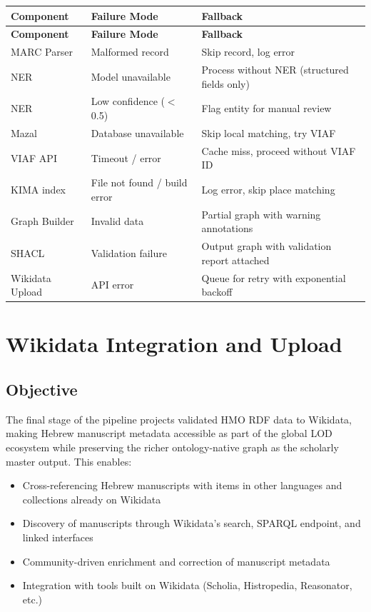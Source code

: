 \documentclass[12pt]{article}
\begin{document}
\begin{longtable}{|l|p{5cm}|p{5cm}|}
\hline
\textbf{Component} & \textbf{Failure Mode} & \textbf{Fallback} \\
\hline
\endfirsthead
\hline
\textbf{Component} & \textbf{Failure Mode} & \textbf{Fallback} \\
\hline
\endhead
\hline
\endfoot
MARC Parser & Malformed record & Skip record, log error \\
\hline
NER & Model unavailable & Process without NER (structured fields only) \\
\hline
NER & Low confidence ($<$0.5) & Flag entity for manual review \\
\hline
Mazal & Database unavailable & Skip local matching, try VIAF \\
\hline
VIAF API & Timeout / error & Cache miss, proceed without VIAF ID \\
\hline
KIMA index & File not found / build error & Log error, skip place matching \\
\hline
Graph Builder & Invalid data & Partial graph with warning annotations \\
\hline
SHACL & Validation failure & Output graph with validation report attached \\
\hline
Wikidata Upload & API error & Queue for retry with exponential backoff \\
\hline
\end{longtable}


\section{Wikidata Integration and Upload}
\label{sec:wikidata}

\subsection{Objective}

The final stage of the pipeline projects validated HMO RDF data to Wikidata, making Hebrew manuscript metadata accessible as part of the global LOD ecosystem while preserving the richer ontology-native graph as the scholarly master output. This enables:

\begin{itemize}
\item Cross-referencing Hebrew manuscripts with items in other languages and collections already on Wikidata
\item Discovery of manuscripts through Wikidata's search, SPARQL endpoint, and linked interfaces
\item Community-driven enrichment and correction of manuscript metadata
\item Integration with tools built on Wikidata (Scholia, Histropedia, Reasonator, etc.)
\end{itemize}
\end{document}
